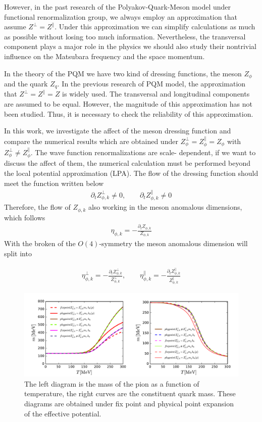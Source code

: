 \documentclass[%
reprint,
superscriptaddress,
showpacs,preprintnumbers,
 amsmath,amssymb,
 aps,
prd,
]{revtex4-1}
\begin{document}
However, in the past research of the Polyakov-Quark-Meson model under functional renormalization group, we always employ an 
approximation that assume $Z^{\bot}=Z^{\|}$. Under this approximation we can simplify calculations as much as possible without 
losing too much information. Nevertheless, the transversal component plays a major role in the physics we should also study their 
nontrivial influence on the Matsubara frequency and the space momentum.\par

In the theory of the PQM we have two kind of dressing functions, the meson $Z_{\phi}$ and the quark $Z_{q}$. In the previous 
research of PQM model, the approximation that $Z^{\bot}=Z^{\|}=Z$ is widely used. The transversal and longitudinal components are
assumed to be equal. However, the magnitude of this approximation has not been studied. Thus, it is necessary to check the 
reliability of this approximation.\par

In this work, we investigate the affect of the meson dressing function and compare the numerical results which are obtained under 
$Z^{\bot}_{\phi}=Z^{\|}_{\phi}=Z_{\phi}$ with $Z^{\bot}_{\phi}\neq Z^{\|}_{\phi}$. The wave function renormalizations are scale-
dependent, if we want to discuss the affect of them, the numerical calculation must be performed beyond the local potential 
approximation (LPA). The flow of the dressing function should meet the function written below
\begin{align}
\partial_tZ^{\bot}_{\phi,k}\neq 0,\qquad \partial_tZ^{\|}_{\phi,k}\neq 0
\end{align}
Therefore, the flow of $Z_{\phi,k}$ also working in the meson anomalous dimensions, which follows
\begin{align}
\eta_{\phi,k}=-\frac{\partial_tZ_{\phi,k}}{Z_{\phi,k}}\label{eq:anodim1}
\end{align}
With the broken of the $O(4)$-symmetry the meson anomalous dimension will split into

\begin{align}
\eta_{\phi,k}^\bot=-\frac{\partial_tZ_{\phi,k}^\bot}{Z_{\phi,k}^\bot} ,\qquad \eta_{\phi,k}^\|=-\frac{\partial_tZ_{\phi,k}^\|}
{Z_{\phi,k}^\|}\label{eq:anodim}
\end{align}


\begin{figure}[t]
\label{fig:m}
\includegraphics[width=1.0\textwidth]{m.pdf}
\caption{The left diagram is the mass of the pion as a function of temperature, the right curves are the constituent quark mass. 
These diagrams are obtained under fix point and physical point expansion of the effective potential.}
\end{figure}
\end{document}
